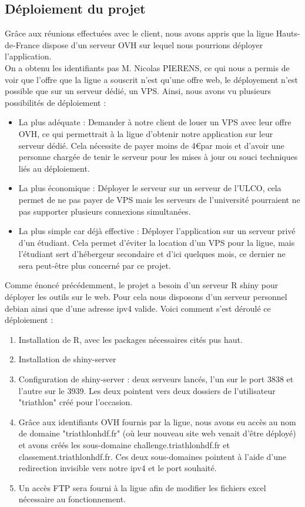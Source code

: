 \subsection {Déploiement du projet}
Grâce aux réunions effectuées avec le client, nous avons appris que la ligue Hauts-de-France dispose d'un serveur OVH sur lequel nous pourrions déployer l'application. \\
On a obtenu les identifiants pas M. Nicolas PIERENS, ce qui nous a permis de voir que l'offre que la ligue a souscrit n'est qu'une offre web, le déployement n'est possible que sur un serveur dédié, un VPS. Ainsi, nous avons vu plusieurs possibilités de déploiement : 
\begin{itemize}
\item  La plus adéquate : Demander à notre client de louer un VPS avec leur offre OVH, ce qui permettrait à la ligue d'obtenir notre application sur leur serveur dédié. Cela nécessite de payer moins de 4\euro par mois et d'avoir une personne chargée de tenir le serveur pour les mises à jour ou souci techniques liés au déploiement.
\item La plus économique : Déployer le serveur sur un serveur de l'ULCO, cela permet de ne pas payer de VPS mais les serveurs de l'université pourraient ne pas supporter plusieurs connexions simultanées.
\item La plus simple car déjà effective : Déployer l'application sur un serveur privé d'un étudiant. Cela permet d'éviter la location d'un VPS pour la ligue, mais l'étudiant sert d'hébergeur secondaire et d'ici quelques mois, ce dernier ne sera peut-être plus concerné par ce projet.
\end{itemize} 

Comme énoncé précédemment, le projet a besoin d'un serveur R shiny pour déployer les outils sur le web.
Pour cela nous disposons d'un serveur personnel debian ainsi que d'une adresse ipv4 valide.
Voici comment s'est déroulé ce déploiement :

\begin{enumerate} 
	\item Installation de R, avec les packages nécessaires cités pus haut. \cite{ref2}
	\item Installation de shiny-server \cite{ref3}
	\item Configuration de shiny-server : deux serveurs lancés, l'un sur le port 3838 et l'autre sur le 3939. Les deux pointent vers deux dossiers de l'utilisateur "triathlon" créé pour l'occasion.
	\item Grâce aux identifiants OVH \cite{ref4} fournis par la ligue, nous avons eu accès au nom de domaine "triathlonhdf.fr" (où leur nouveau site web venait d'être déployé) et avons créés les sous-domaine challenge.triathlonhdf.fr et classement.triathlonhdf.fr. Ces deux sous-domaines pointent à l'aide d'une redirection invisible vers notre ipv4 et le port souhaité.
	\item Un accès FTP sera fourni à la ligue afin de modifier les fichiers excel nécessaire au fonctionnement.
\end{enumerate}


